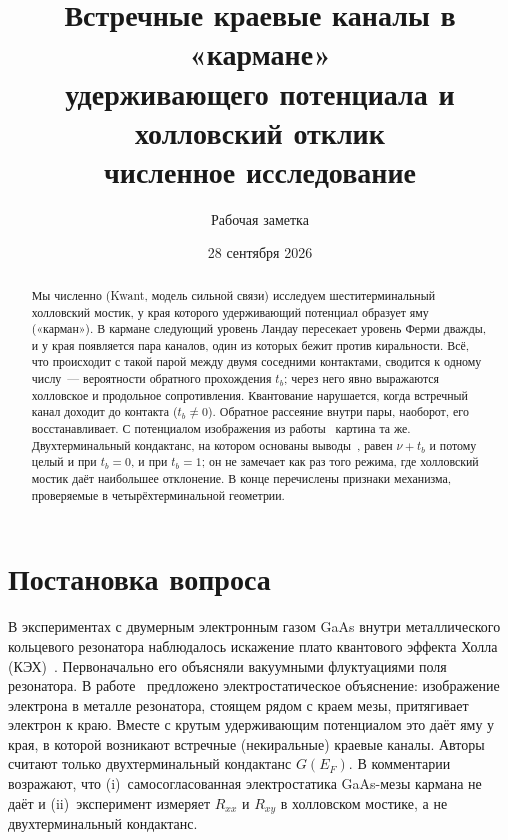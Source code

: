 \documentclass[11pt,a4paper]{article}
\title{Встречные краевые каналы в «кармане»\\ удерживающего потенциала
и холловский отклик\\[4pt]
\large численное исследование}
\author{Рабочая заметка}
\date{28 сентября 2026}
\newcommand{\tb}{t_b}
\newcommand{\Rxy}{R_{xy}}
\newcommand{\Rxx}{R_{xx}}
\newcommand{\EF}{E_F}
\begin{document}
\maketitle

\begin{abstract}
\noindent
Мы численно (Kwant, модель сильной связи) исследуем шеститерминальный
холловский мостик, у края которого удерживающий потенциал образует яму
(«карман»). В кармане следующий уровень Ландау пересекает уровень Ферми
дважды, и у края появляется пара каналов, один из которых бежит против
киральности. Всё, что происходит с такой парой между двумя соседними
контактами, сводится к одному числу~--- вероятности обратного прохождения
$\tb$; через него явно выражаются холловское и продольное сопротивления.
Квантование нарушается, когда встречный канал доходит до контакта
($\tb\neq0$). Обратное рассеяние внутри пары, наоборот, его восстанавливает.
С потенциалом изображения из работы~\cite{andolina} картина та же.
Двухтерминальный кондактанс, на котором основаны выводы~\cite{andolina},
равен $\nu+\tb$ и потому целый и при $\tb=0$, и при $\tb=1$; он не замечает
как раз того режима, где холловский мостик даёт наибольшее отклонение.
В конце перечислены признаки механизма, проверяемые в четырёхтерминальной
геометрии.
\end{abstract}

\tableofcontents

\section{Постановка вопроса}

В экспериментах с двумерным электронным газом GaAs внутри металлического
кольцевого резонатора наблюдалось искажение плато квантового эффекта Холла
(КЭХ)~\cite{appugliese}. Первоначально его объясняли вакуумными флуктуациями
поля резонатора. В работе~\cite{andolina} предложено электростатическое
объяснение: изображение электрона в металле резонатора, стоящем рядом с
краем мезы, притягивает электрон к краю. Вместе с крутым удерживающим
потенциалом это даёт яму у края, в которой возникают встречные
(некиральные) краевые каналы. Авторы~\cite{andolina} считают только
двухтерминальный кондактанс $G(\EF)$. В комментарии~\cite{ciuti} возражают,
что (i)~самосогласованная электростатика GaAs-мезы кармана не даёт и
(ii)~эксперимент измеряет $\Rxx$ и $\Rxy$ в холловском мостике, а не
двухтерминальный кондактанс.
\end{document}
